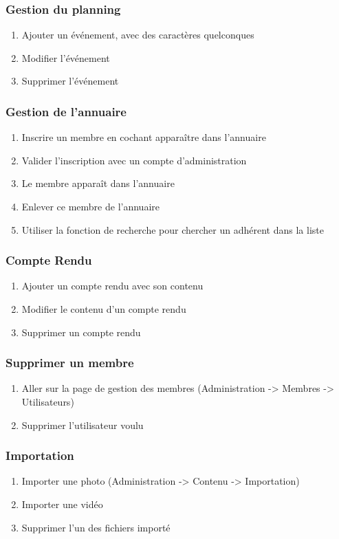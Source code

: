 \documentclass[11pt]{report}
\begin{document}
\subsubsection*{Gestion du planning}
\begin{enumerate}
\item Ajouter un événement, avec des caractères quelconques
\item Modifier l’événement
\item Supprimer l’événement
\end{enumerate}
\subsubsection*{Gestion de l'annuaire}
\begin{enumerate}
\item Inscrire un membre en cochant \og apparaître dans l’annuaire \fg{}
\item Valider l'inscription avec un compte d'administration
\item Le membre apparaît dans l’annuaire
\item Enlever ce membre de l’annuaire
\item Utiliser la fonction de recherche pour chercher un adhérent dans la liste
\end{enumerate}
\subsubsection*{Compte Rendu}
\begin{enumerate}
\item Ajouter un compte rendu avec son contenu
\item Modifier le contenu d’un compte rendu
\item Supprimer un compte rendu
\end{enumerate}
\subsubsection*{Supprimer un membre}
\begin{enumerate}
\item Aller sur la page de gestion des membres (Administration -> Membres -> 
Utilisateurs)
\item Supprimer l'utilisateur voulu
\end{enumerate}

\subsubsection*{Importation}
\begin{enumerate}
\item Importer une photo (Administration -> Contenu -> Importation)
\item Importer une vidéo
\item Supprimer l'un des fichiers importé
\end{enumerate}
\end{document}
